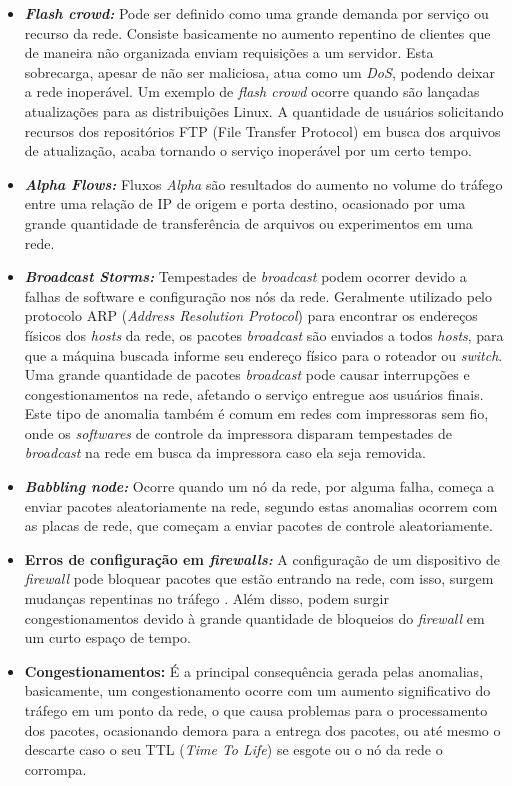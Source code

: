 \begin{itemize}
  \item \textbf{\textit{Flash crowd:}} Pode ser definido como uma grande demanda por serviço ou recurso da rede. Consiste basicamente no aumento repentino de clientes que de maneira não organizada enviam requisições a um servidor. Esta sobrecarga, apesar de não ser maliciosa, atua como um \textit{DoS}, podendo deixar a rede inoperável. Um exemplo de \textit{flash crowd} ocorre quando são lançadas atualizações para as distribuições Linux. A quantidade de usuários solicitando recursos dos repositórios FTP (File Transfer Protocol) em busca dos arquivos de atualização, acaba tornando o serviço inoperável por um certo tempo.
  \item \textbf{\textit{Alpha Flows:}} Fluxos \textit{Alpha} são resultados do aumento no volume do tráfego entre uma relação de IP de origem e porta destino, ocasionado por uma grande quantidade de transferência de arquivos ou experimentos em uma rede.
  \item \textbf{\textit{Broadcast Storms:}} Tempestades de \textit{broadcast} podem ocorrer devido a falhas de software e configuração nos nós da rede. Geralmente utilizado pelo protocolo ARP (\textit{Address Resolution Protocol}) para encontrar os endereços físicos dos \textit{hosts} da rede, os pacotes \textit{broadcast} são enviados a todos \textit{hosts}, para que a máquina buscada informe seu endereço físico para o roteador ou \textit{switch}. Uma grande quantidade de pacotes \textit{broadcast} pode causar interrupções e congestionamentos na rede, afetando o serviço entregue aos usuários finais. Este tipo de anomalia também é comum em redes com impressoras sem fio, onde os \textit{softwares} de controle da impressora disparam tempestades de \textit{broadcast} na rede em busca da impressora caso ela seja removida.
  \item \textbf{\textit{Babbling node:}} Ocorre quando um nó da rede, por alguma falha, começa a enviar pacotes aleatoriamente na rede, segundo  estas anomalias ocorrem com as placas de rede, que começam a enviar pacotes de controle aleatoriamente.
  \item \textbf{Erros de configuração em \textit{firewalls:}} A configuração de um dispositivo de \textit{firewall} pode bloquear pacotes que estão entrando na rede, com isso, surgem mudanças repentinas no tráfego \cite{Zarpelao2010}. Além disso, podem surgir congestionamentos devido à grande quantidade de bloqueios do \textit{firewall} em um curto espaço de tempo.
  \item \textbf{Congestionamentos:} É a principal consequência gerada pelas anomalias, basicamente, um congestionamento ocorre com um aumento significativo do tráfego em um ponto da rede, o que causa problemas para o processamento dos pacotes, ocasionando demora para a entrega dos pacotes, ou até mesmo o descarte caso o seu TTL (\textit{Time To Life}) se esgote ou o nó da rede o corrompa.
\end{itemize}


